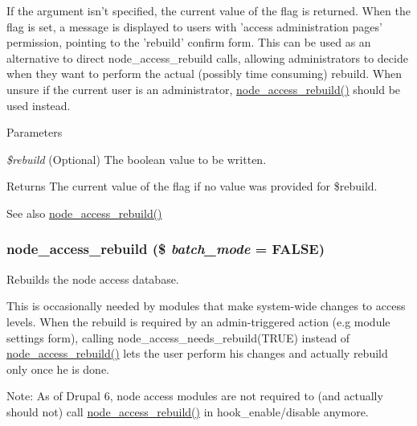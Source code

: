 If the argument isn't specified, the current value of the flag is returned. When the flag is set, a message is displayed to users with 'access administration pages' permission, pointing to the 'rebuild' confirm form. This can be used as an alternative to direct node\_\-access\_\-rebuild calls, allowing administrators to decide when they want to perform the actual (possibly time consuming) rebuild. When unsure if the current user is an administrator, \hyperlink{group__node__access_gaf04007aedfc3afbe074b2fe4065ab618}{node\_\-access\_\-rebuild()} should be used instead.


\begin{DoxyParams}{Parameters}
\item[{\em \$rebuild}](Optional) The boolean value to be written.\end{DoxyParams}
\begin{DoxyReturn}{Returns}
The current value of the flag if no value was provided for \$rebuild.
\end{DoxyReturn}
\begin{DoxySeeAlso}{See also}
\hyperlink{group__node__access_gaf04007aedfc3afbe074b2fe4065ab618}{node\_\-access\_\-rebuild()} 
\end{DoxySeeAlso}
\hypertarget{group__node__access_gaf04007aedfc3afbe074b2fe4065ab618}{
\subsubsection[{node\_\-access\_\-rebuild}]{\setlength{\rightskip}{0pt plus 5cm}node\_\-access\_\-rebuild (\$ {\em batch\_\-mode} = {\ttfamily FALSE})}}
\label{group__node__access_gaf04007aedfc3afbe074b2fe4065ab618}
Rebuilds the node access database.

This is occasionally needed by modules that make system-\/wide changes to access levels. When the rebuild is required by an admin-\/triggered action (e.g module settings form), calling node\_\-access\_\-needs\_\-rebuild(TRUE) instead of \hyperlink{group__node__access_gaf04007aedfc3afbe074b2fe4065ab618}{node\_\-access\_\-rebuild()} lets the user perform his changes and actually rebuild only once he is done.

Note: As of Drupal 6, node access modules are not required to (and actually should not) call \hyperlink{group__node__access_gaf04007aedfc3afbe074b2fe4065ab618}{node\_\-access\_\-rebuild()} in hook\_\-enable/disable anymore.

